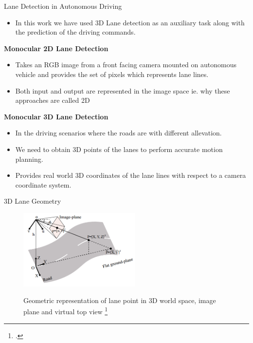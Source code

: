 \documentclass[aspectratio=169]{beamer}
\begin{document}
\begin{frame}{Lane Detection in Autonomous Driving}
    \begin{itemize}
        \item In this work we have used 3D Lane detection as an auxiliary task along with the prediction of the driving commands.
    \end{itemize}
    
    \textbf{Monocular 2D Lane Detection}
    \begin{itemize}
        \item Takes an RGB image from a front facing camera mounted on autonomous vehicle and provides the set of pixels which represents lane lines. 
        \item Both input and output are represented in the image space ie. why these approaches are called 2D
        
    \end{itemize}
    
    \textbf{Monocular 3D Lane Detection}
    \begin{itemize}
        \item In the driving scenarios where the roads are with different allevation.
        \item We need to obtain 3D points of the lanes to perform accurate motion planning.
        \item Provides real world 3D coordinates of the lane lines with respect to a camera coordinate system.
    \end{itemize}
\end{frame}
\begin{frame}{3D Lane Geometry}
    \begin{figure}[H]
     \centering
     
\includegraphics[width=0.6\linewidth, height=4cm]{images/3d_lane_geometry.png} 
\label{fig:subim1}

\caption{Geometric representation of lane point in 3D world space, image plane and virtual top view \footcite{DBLP:journals/corr/abs-2112-15351} }
\label{fig:image2}
\end{figure}
\end{frame}
\end{document}
